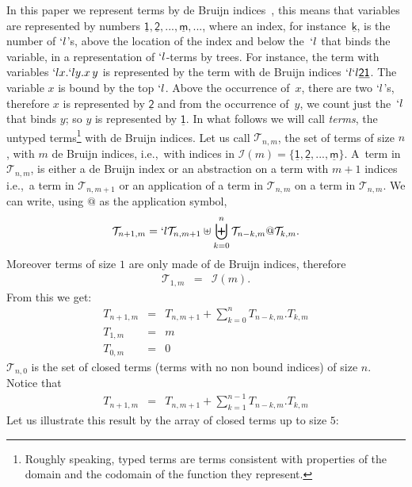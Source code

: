 \documentclass[preprint,authoryear]{elsarticle}
\newcommand{\ie}{i.e.,~}
\newcommand{\T}{\mathcal{T}}
\newcommand{\Var}[1]{\underline{\mathsf{#1}}}
\begin{document}
In this paper we represent terms by de Bruijn indices~\cite{NGDeBruijn108}, this means that
variables are represented by numbers $\Var{1}, \Var{2}, ..., \Var{m}, ...$, where an
index, for instance~$\Var{k}$, is the number of $`l$'s, above the location of the index and
below the~$`l$ that binds the variable, in a representation of $`l$-terms by trees.  For
instance, the term with variables $`l x. `l y. x\,y$ is represented by the term with de
Bruijn indices $`l `l \Var{2} \Var{1}$. The variable $x$ is bound by the top $`l$.  Above
the occurrence of~$x$, there are two $`l$'s, therefore $x$ is represented by $\Var{2}$ and
from the occurrence of~$y$, we count just the~$`l$ that binds $y$; so $y$ is represented
by $\Var{1}$.  In what follows we will call \emph{terms}, the untyped
terms\footnote{Roughly speaking, typed terms are terms consistent with properties of the domain and
  the codomain of the function they represent.} with de Bruijn
indices.  Let us call $\T_{n,m}$, the set of terms of size $n$, with $m$ de Bruijn
indices, \ie with indices in $\mathcal{I}(m) = \{\Var{1}, \Var{2}, ..., \Var{m}\}$.
A~term in $\T_{n,m}$, is either a de Bruijn index or an abstraction on a term with $m+1$
indices \ie a term in $\T_{n,m+1}$ or an application of a term in $\T_{n,m}$ on a term in
$\T_{n,m}$.  We can write, using $@$ as the application symbol,
\[\T_{n+1,m} = `l \T_{n,m+1} \uplus \biguplus_{k=0}^n\T_{n-k,m} @ \T_{k,m} .\]
Moreover terms of size $1$ are only made of de Bruijn
indices,  therefore 
\begin{eqnarray*}
  \T_{1,m} &=& \mathcal{I}(m).
\end{eqnarray*}
From this we get:
\begin{eqnarray*}
  T_{n+1,m} &=&  T_{n,m+1} + \sum_{k=0}^{n} T_{n-k,m}.T_{k,m} \\
  T_{1,m} & =& m\\
  T_{0,m} &=& 0
\end{eqnarray*}
$\T_{n,0}$ is the set of closed terms (terms with no non bound indices) of size $n$.  Notice that  
\begin{eqnarray*}
  T_{n+1,m} &=&  T_{n,m+1} + \sum_{k=1}^{n-1} T_{n-k,m}.T_{k,m} 
\end{eqnarray*}
Let us illustrate this result by the array of closed terms up to size $5$:
\end{document}
